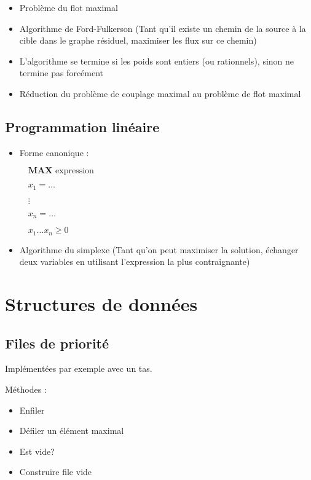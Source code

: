 \documentclass[10pt,a4paper]{article}
\begin{document}
\begin{itemize}[noitemsep]
	\item Problème du flot maximal
	\item Algorithme de Ford-Fulkerson (Tant qu'il existe un chemin de la source à la cible dans le graphe résiduel, maximiser les flux sur ce chemin)
	\item L'algorithme se termine si les poids sont entiers (ou rationnels), sinon ne termine pas forcément
	\item Réduction du problème de couplage maximal au problème de flot maximal
\end{itemize}


\subsection{Programmation linéaire}

\begin{itemize}[noitemsep]
	\item Forme canonique :
	
		\(  \quad \textbf{MAX} \text{ expression}  \)
		
		\(  \quad x_1 = \ldots  \)
		
		\(  \quad \vdots \)
		
		\(  \quad x_n = \ldots  \)
		
		\(  \quad x_1 \ldots x_n \geq 0  \)
	\item Algorithme du simplexe (Tant qu'on peut maximiser la solution, échanger deux variables en utilisant l'expression la plus contraignante)
\end{itemize}


\section{Structures de données}

%
\subsection{Files de priorité}

Implémentées par exemple avec un tas.

Méthodes : 
\begin{itemize}[noitemsep]
	\item Enfiler
	\item Défiler un élément maximal
	\item Est vide?
	\item Construire file vide
\end{itemize}
\end{document}
